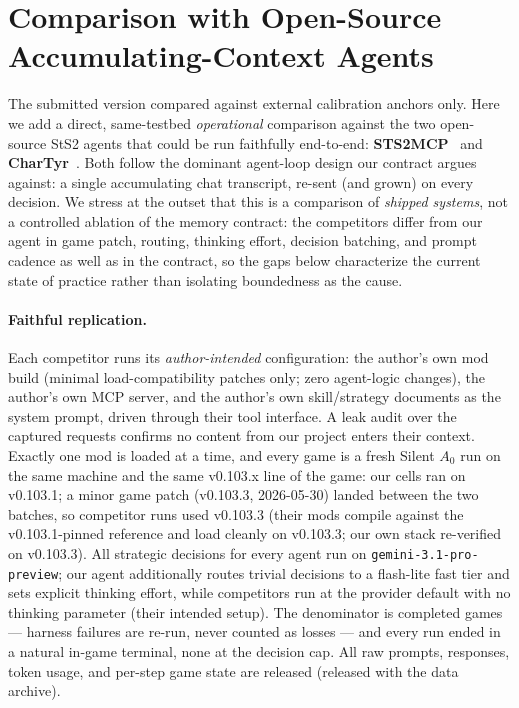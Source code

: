 
\section{Comparison with Open-Source Accumulating-Context Agents}
\label{sec:competitors}

The submitted version compared against external calibration anchors only. Here we add a
direct, same-testbed \emph{operational} comparison against the two open-source StS2 agents
that could be run faithfully end-to-end: \textbf{STS2MCP}~\citep{sts2mcp-2026} and
\textbf{CharTyr}~\citep{chartyr-sts2-2026}. Both follow the dominant agent-loop design our
contract argues against: a single accumulating chat transcript, re-sent (and grown) on
every decision. We stress at the outset that this is a comparison of \emph{shipped systems},
not a controlled ablation of the memory contract: the competitors differ from our agent in
game patch, routing, thinking effort, decision batching, and prompt cadence as well as in
the contract, so the gaps below characterize the current state of practice rather than
isolating boundedness as the cause.

\paragraph{Faithful replication.}
Each competitor runs its \emph{author-intended} configuration: the author's own mod build
(minimal load-compatibility patches only; zero agent-logic changes), the author's own MCP
server, and the author's own skill/strategy documents as the system prompt, driven through
their tool interface. A leak audit over the captured requests confirms no content from our
project enters their context. Exactly one mod is loaded at a time, and every game is a
fresh Silent $A_0$ run on the same machine and the same v0.103.x line of the game: our
cells ran on v0.103.1; a minor game patch (v0.103.3, 2026-05-30) landed between the two
batches, so competitor runs used v0.103.3 (their mods compile against the v0.103.1-pinned
reference and load cleanly on v0.103.3; our own stack re-verified on v0.103.3). All strategic
decisions for every agent run on \texttt{gemini-3.1-pro-preview}; our agent additionally
routes trivial decisions to a flash-lite fast tier and sets explicit thinking effort,
while competitors run at the provider default with no thinking parameter (their intended
setup). The denominator is completed games --- harness failures are re-run, never counted
as losses --- and every run ended in a natural in-game terminal, none at the decision cap.
All raw prompts, responses, token usage, and per-step game state are released
(released with the data archive).

